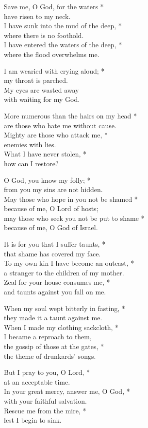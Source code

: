 Save me, O God, for the waters *\\
have risen to my neck. \\
I have sunk into the mud of the deep, *\\
where there is no foothold. \\
I have entered the waters of the deep, *\\
where the flood overwhelms me.

I am wearied with crying aloud; *\\
my throat is parched. \\
My eyes are wasted away \\
with waiting for my God. 

More numerous than the hairs on my head *\\
are those who hate me without cause. \\
Mighty are those who attack me, *\\
enemies with lies. \\
What I have never stolen, *\\
how can I restore? 

O God, you know my folly; *\\
from you my sins are not hidden. \\
May those who hope in you not be shamed *\\
because of me, O Lord of hosts; \\
may those who seek you not be put to shame *\\
because of me, O God of Israel.

It is for you that I suffer taunts, *\\
that shame has covered my face. \\
To my own kin I have become an outcast, *\\
a stranger to the children of my mother. \\
Zeal for your house consumes me, *\\
and taunts against you fall on me.

When my soul wept bitterly in fasting, *\\
they made it a taunt against me. \\
When I made my clothing sackcloth, *\\
I became a reproach to them, \\
the gossip of those at the gates, *\\
the theme of drunkards' songs. 

But I pray to you, O Lord, *\\
at an acceptable time. \\
In your great mercy, answer me, O God, *\\
with your faithful salvation. \\
Rescue me from the mire, *\\
lest I begin to sink. 

